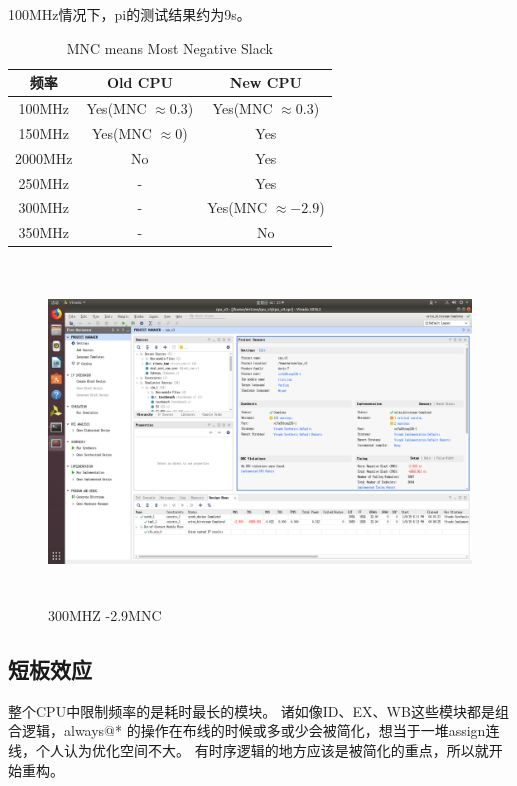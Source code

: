 \documentclass[a4paper,10pt,oneside]{article}
\begin{document}
100MHz情况下，pi的测试结果约为9s。
\begin{table}[H]
\centering
\begin{tabular}{ccc}
\toprule
\multicolumn{1}{c}{频率} & \multicolumn{1}{c}{Old CPU} & \multicolumn{1}{c}{New CPU}\\ 
\midrule
100MHz                  & Yes(MNC $\approx 0.3$)                         & Yes(MNC $\approx 0.3$) \\
150MHz                  & Yes(MNC $\approx 0$)                         & Yes \\
2000MHz                 & No                          & Yes \\
250MHz                  & -                          & Yes \\
300MHz                  & -                          & Yes(MNC $\approx -2.9$) \\
350MHz                  & -                          & No  \\
\bottomrule
\end{tabular}
\caption{MNC means Most Negative Slack}
\end{table}
\begin{figure}[H]
  \begin{center}
    \includegraphics[height=9cm]{300MHz-MNC.png}
  \end{center}
  \caption{300MHZ -2.9MNC}
\end{figure}

\subsection{短板效应} 整个CPU中限制频率的是耗时最长的模块。 诸如像ID、EX、WB这些模块都是组合逻辑，always@* 的操作在布线的时候或多或少会被简化，想当于一堆assign连线，个人认为优化空间不大。 有时序逻辑的地方应该是被简化的重点，所以就开始重构。
\end{document}
